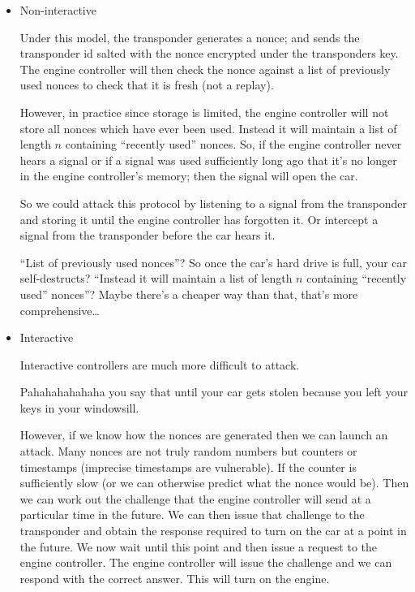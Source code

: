 \documentclass[10pt,\jkfside,a4paper]{article}
\begin{document}
\begin{enumerate}
\begin{itemize}
\item Non-interactive

Under this model, the transponder generates a nonce; and sends
the transponder id salted with the nonce encrypted under the transponders key.
The engine controller will then check the nonce against a list of previously used 
nonces to check that it is fresh (not a replay). 

However, in practice since storage is limited, the engine controller will not store 
all nonces which have ever been used. Instead it will maintain a list of length $n$ 
containing ``recently used'' nonces. So, if the engine controller never hears a signal 
or if a signal was used sufficiently long ago that it's no longer in the engine controller's 
memory; then the signal will open the car.

So we could attack this protocol by listening to a signal from the transponder and storing it 
until the engine controller has forgotten it. Or intercept a signal from the transponder before 
the car hears it.

{\color{blue} ``List of previously used nonces''? So once the car's hard drive is full, your car
self-destructs? ``Instead it will maintain a list of length $n$ containing ``recently used'' nonces''? Maybe there's
a cheaper way than that, that's more comprehensive\ldots}

\item Interactive

Interactive controllers are much more difficult to attack.

{\color{blue} Pahahahahahaha you say that until your car gets stolen because you left your keys in your
windowsill.}

However, if we know how the nonces are generated then we can launch an attack. Many 
nonces are not truly random numbers but counters or timestamps (imprecise timestamps are 
vulnerable). If the counter is 
sufficiently slow (or we can otherwise predict what the nonce would be). Then we can 
work out the challenge that the engine controller will send at a particular time in the 
future. We can then issue that challenge to the transponder and 
obtain the response required to turn on the car at a point in the future. We now 
wait until this point and then issue a request to the engine controller. The engine 
controller will issue the challenge and we can respond with the correct answer. This 
will turn on the engine.

\end{itemize}


\end{enumerate}
\end{document}
